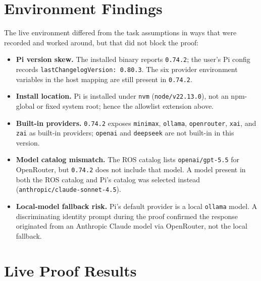 \documentclass[11pt]{article}
\newcommand{\code}[1]{\texttt{#1}}
\begin{document}
\section{Environment Findings}

The live environment differed from the task assumptions in ways that were
recorded and worked around, but that did not block the proof:

\begin{itemize}
  \item \textbf{Pi version skew.} The installed binary reports \code{0.74.2};
    the user's Pi config records \code{lastChangelogVersion: 0.80.3}. The six
    provider environment variables in the host mapping are still present in
    \code{0.74.2}.
  \item \textbf{Install location.} Pi is installed under
    \code{nvm} (\code{node/v22.13.0}), not an npm-global or fixed system root;
    hence the allowlist extension above.
  \item \textbf{Built-in providers.} \code{0.74.2} exposes
    \code{minimax}, \code{ollama}, \code{openrouter}, \code{xai}, and
    \code{zai} as built-in providers; \code{openai} and \code{deepseek} are not
    built-in in this version.
  \item \textbf{Model catalog mismatch.} The ROS catalog lists
    \code{openai/gpt-5.5} for OpenRouter, but \code{0.74.2} does not include
    that model. A model present in both the ROS catalog and Pi's catalog was
    selected instead (\code{anthropic/claude-sonnet-4.5}).
  \item \textbf{Local-model fallback risk.} Pi's default provider is a local
    \code{ollama} model. A discriminating identity prompt during the proof
    confirmed the response originated from an Anthropic Claude model via
    OpenRouter, not the local fallback.
\end{itemize}

\section{Live Proof Results}
\end{document}
